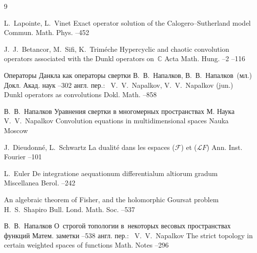 \begin{thebibliography}{9}

\by L.~Lapointe, L.~Vinet
\paper Exact operator solution of the Calogero--Sutherland model
\jour Commun. Math. Phys.
--452


\by J.~J.~Betancor, M.~Sifi, K.~Trim\'eche
\paper Hypercyclic and chaotic convolution operators associated with the Dunkl operators on~$\mathbb  C$
\jour Acta Math. Hung.
--2
--116


\paper Операторы Данкла как операторы свертки
\by В.~В.~Напалков, В.~В.~Напалков~(мл.)
\jour Докл. Акад. наук
--302
\transl англ. пер.:~
\by  V.~V.~Napalkov, V.~V.~Napalkov (jun.)
\paper Dunkl operators as convolutions
\jour Dokl. Math.
--858 


\by В.~В.~Напалков
\book Уравнения свертки в многомерных пространствах 
\publaddr М.
\publ Наука
\misctransl
\by  V.~V.~Napalkov
\book Convolution equations in multidimensional spaces
\publ Nauka
\publaddr Moscow

\by J.~Dieudonn\'e, L.~Schwartz
\paper La dualit\'e dans les espaces ($\mathcal F$) et ($\mathcal LF$)
\jour Ann. Inst. Fourier 
--101 

\by L.~Euler
\paper De integratione aequationum differentialum altiorum gradum
\jour Miscellanea Berol.
–242

\paper An algebraic theorem of Fisher, and the holomorphic Goursat problem
\by H.~S.~Shapiro
\jour Bull. Lond. Math. Soc.
--537


\by В.~В.~Напалков
\paper О~строгой топологии в~некоторых весовых пространствах функций
\jour Матем. заметки
--538
\transl англ. пер.:~
\by V.~V.~Napalkov
\paper The strict topology in certain weighted spaces of functions
\jour Math. Notes
--296


\end{thebibliography}
